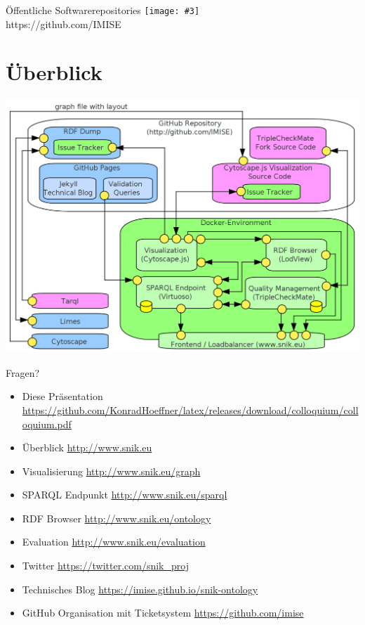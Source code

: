 \documentclass{beamer}
\newcommand{\imageslide}[3][]
{
\begin{frame}{#2}
\centering\texttt{[image: \#3]}
\\#1
\end{frame}
}
\begin{document}
\imageslide[https://github.com/IMISE]{Öffentliche Softwarerepositories}{../sniktec/img/github.png}

\section{Überblick}

\begin{frame}
\includegraphics[width=\textwidth]{../sniktec/img/architecture.png}
\end{frame}

\begin{frame}[fragile]{Fragen?}
\begin{itemize}
\item Diese Präsentation \url{https://github.com/KonradHoeffner/latex/releases/download/colloquium/colloquium.pdf}
\vspace{0.5em}%
\item Überblick \url{http://www.snik.eu}
\item Visualisierung \url{http://www.snik.eu/graph}
\item SPARQL Endpunkt \url{http://www.snik.eu/sparql}
\item RDF Browser \url{http://www.snik.eu/ontology}
\item Evaluation \url{http://www.snik.eu/evaluation}
\item Twitter \url{https://twitter.com/snik\_proj}
\item Technisches Blog \url{https://imise.github.io/snik-ontology}
\item GitHub Organisation mit Ticketsystem \url{https://github.com/imise}
\end{itemize}
\end{frame}
\end{document}
